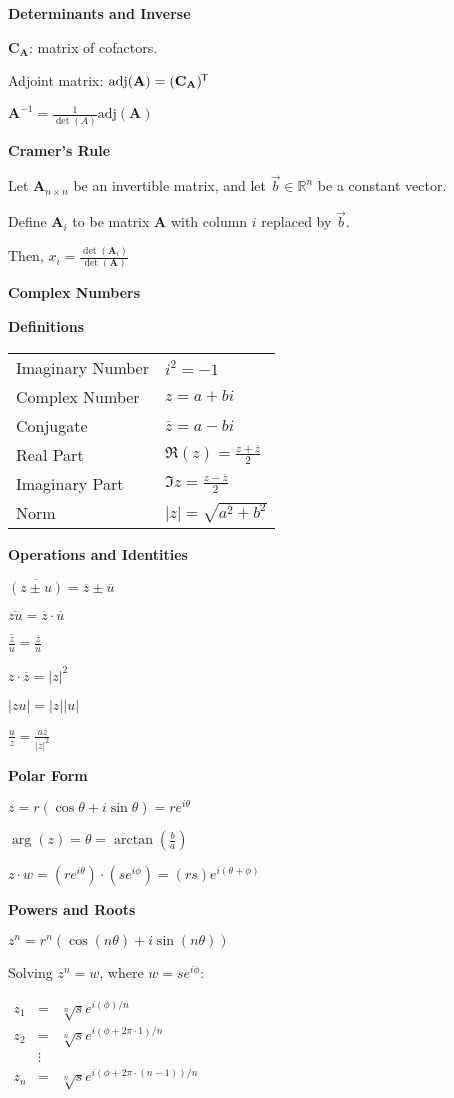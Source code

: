 \documentclass[10pt]{article}
\newcommand{\R}{{\mathbb R}}
\newcommand{\matr}[1]{\mathbf{#1}}
\newcommand{\tran}{^{\mkern-1.5mu\mathsf{T}}}
\newcommand{\conj}[1]{\overline{#1}}
\newcommand{\inv}{^{-1}}
\newcommand\sectionheading[1]{\begin{center}\large{\textbf{#1}}\end{center}\normalsize}
\newcommand\heading[1]{\medskip\textbf{#1}\medskip}
\begin{document}
\begin{multicols*}{3}
\heading{Determinants and Inverse}

$\matr{C_A}$: matrix of cofactors.

Adjoint matrix: $\mathrm{adj}(\matr{A})=(\matr{C_A})\tran$

$\matr{A}\inv=\frac{1}{\det(A)}\mathrm{adj}(\matr{A})$

\heading{Cramer's Rule}

Let $\matr{A}_{n\times n}$ be an invertible matrix, and let $\vec b\in\R^n$ be a constant vector.

Define $\matr{A}_i$ to be matrix $\matr{A}$ with column $i$ replaced by $\vec b$. 

Then, $x_i=\frac{\det(\matr{A}_i)}{\det(\matr{A})}$

\sectionheading{Complex Numbers}

\heading{Definitions}

\begin{tabular}{@{}ll}
    Imaginary Number & $i^2=-1$ \\
    Complex Number & $z=a+bi$ \\
    Conjugate & $\conj{z}=a-bi$ \\
    Real Part & $\Re(z)=\frac{z+\conj{z}}{2}$ \\
    Imaginary Part & $\Im{z}=\frac{z-\conj{z}}{2}$ \\
    Norm & $|z|=\sqrt{a^2+b^2}$
\end{tabular}

\heading{Operations and Identities}

$\conj{(z\pm u)}=\conj{z}\pm\conj{u}$

$\conj{zu}=\conj{z}\cdot\conj{u}$

$\conj{\frac{z}{u}}=\frac{\conj{z}}{\conj{u}}$

$z\cdot\conj{z}=|z|^2$

$|zu|=|z||u|$

$\frac{u}{z}=\frac{u\conj{z}}{|z|^2}$

\heading{Polar Form}

$z=r(\cos\theta+i\sin\theta)=re^{i\theta}$

$\arg(z)=\theta=\arctan(\frac{b}{a})$

$z\cdot w=(re^{i\theta})\cdot(se^{i\phi})=(rs)e^{i(\theta+\phi)}$

\heading{Powers and Roots}

$z^n=r^n(\cos(n\theta)+i\sin(n\theta))$

Solving $z^n=w$, where $w=se^{i\phi}$:

$\begin{array}{ccl}
    z_1 & = & \sqrt[n]{s}e^{i(\phi)/n} \\
    z_2 & = & \sqrt[n]{s}e^{i(\phi+2\pi\cdot 1)/n} \\
    & \vdots & \\
    z_n & = & \sqrt[n]{s}e^{i(\phi+2\pi\cdot(n-1))/n} 
\end{array}$


\end{multicols*}
\end{document}
